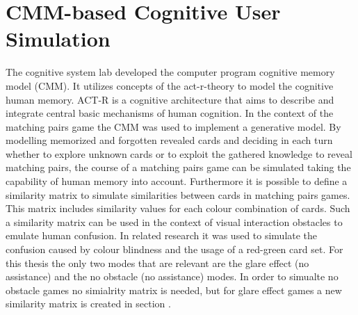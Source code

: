 \chapter{CMM-based Cognitive User Simulation}
The cognitive system lab developed the computer program cognitive memory model (CMM).
It utilizes concepts of the act-r-theory to model the cognitive human memory. ACT-R is a cognitive architecture that aims to describe and integrate  central basic mechanisms of human cognition.  In the context of the matching pairs game the CMM was used to implement a generative model. By modelling memorized and forgotten revealed cards and deciding in each turn whether to explore unknown cards or to exploit the gathered knowledge to reveal matching pairs, the course of a matching pairs game can be simulated taking the capability of human memory into account. Furthermore it is possible to define a similarity matrix to simulate similarities between cards in matching pairs games. This matrix includes similarity values for each colour combination of cards. Such a similarity matrix can be used in the context of visual interaction obstacles to emulate human confusion. In related research it was used to simulate the confusion caused by colour blindness and the usage of a red-green card set. For this thesis the only two modes that are relevant are the glare effect (no assistance) and the no obstacle (no assistance) modes. In order to simualte no obstacle games no simialrity matrix is needed, but for glare effect games a new similarity matrix is created in section .




